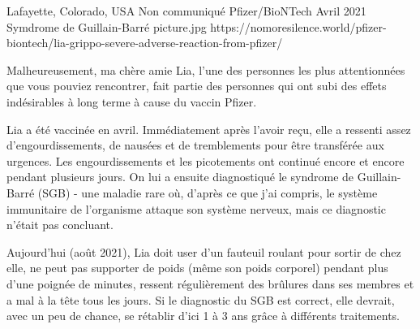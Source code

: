 {Lafayette, Colorado, USA}
{Non communiqué}
{Pfizer/BioNTech}
{Avril 2021}
{Symdrome de Guillain-Barré}
{picture.jpg}
{https://nomoresilence.world/pfizer-biontech/lia-grippo-severe-adverse-reaction-from-pfizer/}
{

Malheureusement, ma chère amie Lia, l'une des personnes les plus attentionnées
que vous pouviez rencontrer, fait partie des personnes qui ont subi des effets
indésirables à long terme à cause du vaccin Pfizer.

Lia a été vaccinée en avril. Immédiatement après l'avoir reçu, elle a ressenti
assez d'engourdissements, de nausées et de tremblements pour être transférée aux
urgences. Les engourdissements et les picotements ont continué encore et encore
pendant plusieurs jours. On lui a ensuite diagnostiqué le syndrome de
Guillain-Barré (SGB) - une maladie rare où, d'après ce que j'ai compris, le
système immunitaire de l'organisme attaque son système nerveux, mais ce
diagnostic n'était pas concluant.

Aujourd'hui (août 2021), Lia doit user d'un fauteuil roulant pour sortir de chez
elle, ne peut pas supporter de poids (même son poids corporel) pendant plus
d'une poignée de minutes, ressent régulièrement des brûlures dans ses membres et
a mal à la tête tous les jours. Si le diagnostic du SGB est correct, elle
devrait, avec un peu de chance, se rétablir d'ici 1 à 3 ans grâce à différents
traitements.

}
